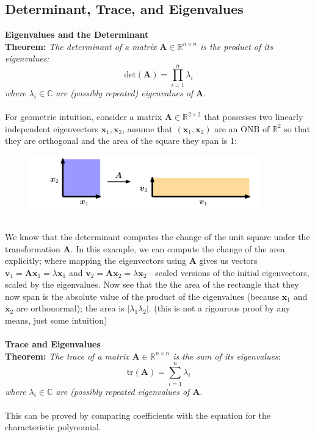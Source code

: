 \documentclass{report}
\begin{document}
\subsection{Determinant, Trace, and Eigenvalues} %
\textbf{Eigenvalues and the Determinant}\\
\textbf{Theorem:} \textit{The determinant of a matrix $\bm{A}\in\mathbb{R}^{n\times n}$ is the product of
its eigenvalues:}
\begin{equation*}
\text{det}(\bm{A})=\prod^n_{i=1}\lambda_i
\end{equation*}
\textit{where $\lambda_i\in\mathbb{C}$ are (possibly repeated) eigenvalues of $\bm{A}$.}\\
\vspace{1mm}\\
For geometric intuition, consider a matrix $\bm{A}\in\mathbb{R}^{2\times 2}$ that possesses two linearly independent
eigenvectors $\bm{x}_1,\bm{x}_2$, assume that $(\bm{x}_1,\bm{x}_2)$ are an ONB of $\mathbb{R}^2$ so that
they are orthogonal and the area of the square they span
is 1:
\begin{figure}[h]
\includegraphics[width=10cm]{19}\\
\centering
\end{figure}\\
We know that the determinant computes the change of the unit square under the transformation $\bm{A}$. 
In this example, we can compute the change of the area explicitly; where 
mapping the eigenvectors using $\bm{A}$ gives us vectors
$\bm{v}_1=\bm{Ax}_1=\lambda\bm{x}_1$ and $\bm{v}_2=\bm{Ax}_2=\lambda\bm{x}_2$---scaled versions of the initial
eigenvectors, scaled by the eigenvalues. Now see that 
the the area of the rectangle that they now span
is the absolute value of the product of the eigenvalues (because $\bm{x}_1$ and $\bm{x}_2$ are orthonormal); the 
area is $|\lambda_1\lambda_2|$. (this is not a rigourous proof by any means, just some intuition)\\
\vspace{1mm}\\
\textbf{Trace and Eigenvalues}\\
\textbf{Theorem:} \textit{The trace of a matrix $\bm{A}\in\mathbb{R}^{n\times n}$ is the sum of its eigenvalues}:
\begin{equation*}
\text{tr}(\bm{A})=\sum^n_{i=1}\lambda_i
\end{equation*}
\textit{where $\lambda_i\in\mathbb{C}$ are (possibly repeated eigenvalues of $\bm{A}$}.\\
\vspace{1mm}\\
This can be proved by comparing coefficients with the equation for the characteristic polynomial.
\newpage
\end{document}
